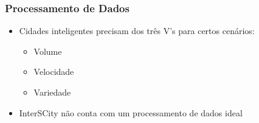 \begin{frame}
    \frametitle{Processamento de Dados}
    \begin{itemize}
        \item Cidades inteligentes precisam dos três V's para certos cenários:
            \begin{itemize}
                \item Volume
                \item Velocidade
                \item Variedade
            \end{itemize}
        \item InterSCity não conta com um processamento de dados ideal
    \end{itemize}
\end{frame}
